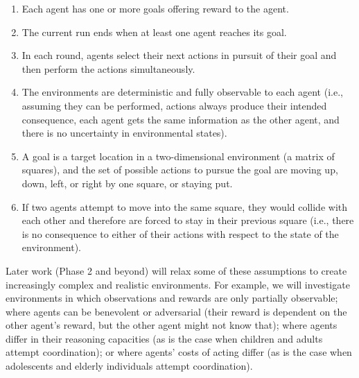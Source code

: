 \documentclass[12pt]{article}
\begin{document}
\begin{enumerate}[label=\bfseries Rule \arabic*:, leftmargin=*,align=left]

\item Each agent has one or more goals offering reward to the agent.
  \vspace{-2mm}

\item The current run ends when at least one agent reaches its goal.
\vspace{-2mm}

\item In each round, agents select their next actions in pursuit of
  their goal and then perform the actions simultaneously.
  \vspace{-2mm}

\item The environments are deterministic and fully observable to each
  agent (i.e., assuming they can be performed, actions always produce
  their intended consequence, each agent gets the same information as
  the other agent, and there is no uncertainty in environmental
  states).  \vspace{-2mm}

\item A goal is a target location in a two-dimensional environment (a
  matrix of squares), and the set of possible actions to pursue the
  goal are moving up, down, left, or right by one square, or staying
  put.  \vspace{-2mm}

\item If two agents attempt to move into the same square, they would
  collide with each other and therefore are forced to stay in their
  previous square (i.e., there is no consequence to either of their
  actions with respect to the state of the environment).
\end{enumerate}
\vspace{-2mm}

Later work (Phase 2 and beyond) will relax some of these assumptions
to create increasingly complex and realistic environments. For
example, we will investigate environments in which observations and
rewards are only partially observable; where agents can be benevolent
or adversarial (their reward is dependent on the other agent's reward,
but the other agent might not know that); where agents differ in their
reasoning capacities (as is the case when children and adults attempt
coordination); or where agents' costs of acting differ (as is the case
when adolescents and elderly individuals attempt coordination).
\end{document}
